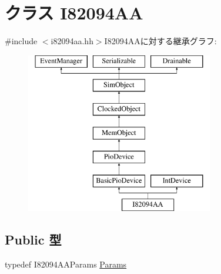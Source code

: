 \hypertarget{classX86ISA_1_1I82094AA}{
\section{クラス I82094AA}
\label{classX86ISA_1_1I82094AA}
}


{\ttfamily \#include $<$i82094aa.hh$>$}I82094AAに対する継承グラフ:\begin{figure}[H]
\begin{center}
\leavevmode
\includegraphics[height=7cm]{classX86ISA_1_1I82094AA}
\end{center}
\end{figure}
\subsection*{Public 型}
\begin{DoxyCompactItemize}
\item 
typedef I82094AAParams \hyperlink{classX86ISA_1_1I82094AA_ab98883343dbcbe45660e9b16b61507ad}{Params}
\end{DoxyCompactItemize}
